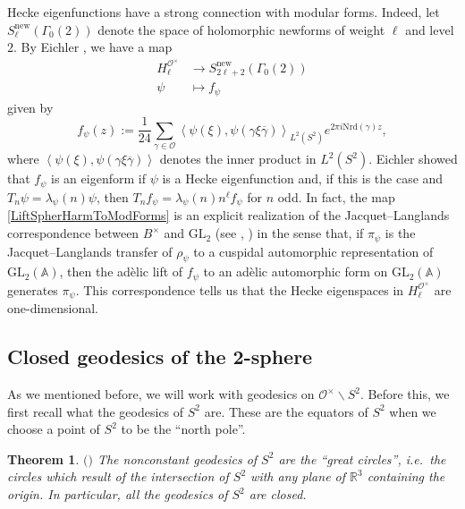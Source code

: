 \documentclass[11pt]{amsart}
\newcommand{\bigo}{\mathcal{O}}
\newcommand{\R}{\mathbb{R}}
\newcommand{\nrd}[1]{\mathrm{Nrd}\left(#1\right)}
\newtheorem{theorem}{Theorem}[section]
\theoremstyle{definition}
\theoremstyle{remark}
\begin{document}
Hecke eigenfunctions have a strong connection with modular forms. Indeed, let $S_{\ell}^{\text{new}}(\Gamma_0(2))$ denote the space of holomorphic newforms of weight $\ell$ and level $2$. By Eichler \cite{EichlerHeckeOp}, we have a map
\begin{align}
    H_{\ell}^{\bigo^{\times}} &\longrightarrow S_{2\ell+2}^{\text{new}}(\Gamma_0(2)) \label{LiftSpherHarmToModForms} \\
    \psi &\longmapsto f_{\psi} \nonumber
\end{align}
given by $$ f_{\psi} (z) := \frac{1}{24}\sum_{\gamma \in \bigo} \left\langle \psi(\xi), \psi\left(\gamma \xi \overline{\gamma} \right) \right\rangle_{L^2(S^2)} e^{2\pi i \nrd{\gamma} z},$$ where $\left\langle \psi(\xi), \psi\left(\gamma \xi \overline{\gamma} \right) \right\rangle$ denotes the inner product in $L^2(S^2)$. Eichler showed that $f_{\psi}$ is an eigenform if $\psi$ is a Hecke eigenfunction and, if this is the case and $T_n \psi = \lambda_{\psi}(n) \psi$, then $T_n f_{\psi} = \lambda_{\psi}(n) n^{\ell} f_{\psi}$ for $n$ odd. In fact, the map \eqref{LiftSpherHarmToModForms} is an explicit realization of the Jacquet--Langlands correspondence between $B^{\times}$ and $\mathrm{GL}_{2}$ (see \cite{GlobalJL}, \cite{JLOriginal}) in the sense that, if $\pi_{\psi}$ is the Jacquet--Langlands transfer of $\rho_{\psi}$ to a cuspidal automorphic representation of $\mathrm{GL}_{2}(\mathbb{A})$, then the adèlic lift of $f_{\psi}$ to an adèlic automorphic form on $\mathrm{GL}_{2}(\mathbb{A})$ generates $\pi_{\psi}$. This correspondence tells us that the Hecke eigenspaces in $H_{\ell}^{\bigo^{\times}}$ are one-dimensional.




\subsection{Closed geodesics of the 2-sphere}

As we mentioned before, we will work with geodesics on $\bigo^{\times} \backslash S^2$. Before this, we first recall what the geodesics of $S^2$ are. These are the equators of $S^2$ when we choose a point of $S^2$ to be the ``north pole''.

\begin{theorem}\label{geodesicsS2}
$\mathrm{(}$\cite[Example 2.80(c)]{RiemannianGeometryGHL}$\mathrm{)}$ The nonconstant geodesics of $S^2$ are the ``great circles'', i.e.~the circles which result of the intersection of $S^2$ with any plane of $\R^3$ containing the origin. In particular, all the geodesics of $S^2$ are closed.
\end{theorem}
\end{document}
